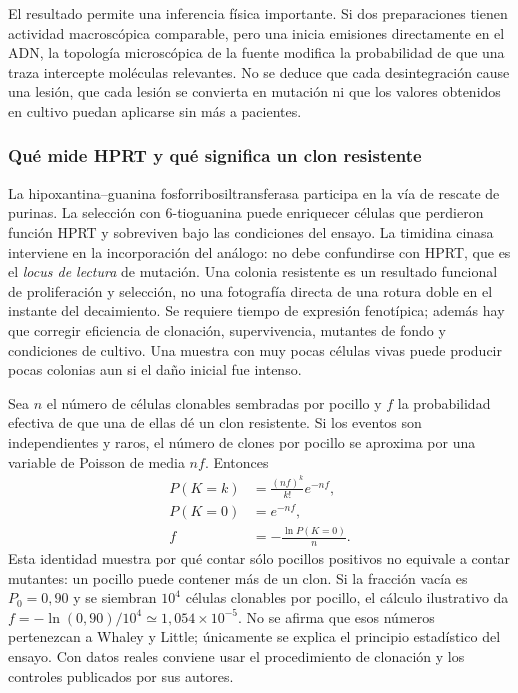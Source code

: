 El resultado permite una inferencia física importante. Si dos preparaciones
tienen actividad macroscópica comparable, pero una inicia emisiones directamente
en el ADN, la topología microscópica de la fuente modifica la probabilidad de
que una traza intercepte moléculas relevantes. No se deduce que cada desintegración
cause una lesión, que cada lesión se convierta en mutación ni que los valores
obtenidos en cultivo puedan aplicarse sin más a pacientes.

\subsubsection{Qué mide HPRT y qué significa un clon resistente}
La hipoxantina--guanina fosforribosiltransferasa participa en la vía de rescate de
purinas. La selección con 6-tioguanina puede enriquecer células que perdieron
función HPRT y sobreviven bajo las condiciones del ensayo. La timidina cinasa
interviene en la incorporación del análogo: no debe confundirse con HPRT,
que es el \emph{locus de lectura} de mutación. Una colonia resistente es un
resultado funcional de proliferación y selección, no una fotografía directa de
una rotura doble en el instante del decaimiento. Se requiere tiempo de expresión
fenotípica; además hay que corregir eficiencia de clonación, supervivencia,
mutantes de fondo y condiciones de cultivo. Una muestra con muy pocas células
vivas puede producir pocas colonias aun si el daño inicial fue intenso.

Sea $n$ el número de células clonables sembradas por pocillo y $f$ la
probabilidad efectiva de que una de ellas dé un clon resistente. Si los
eventos son independientes y raros, el número de clones por pocillo se aproxima
por una variable de Poisson de media $nf$. Entonces
\begin{align}
P(K=k)&=\frac{(nf)^k}{k!}e^{-nf},\\
P(K=0)&=e^{-nf},\\
f&=-\frac{\ln P(K=0)}{n}.
\end{align}
Esta identidad muestra por qué contar sólo pocillos positivos no equivale a
contar mutantes: un pocillo puede contener más de un clon. Si la fracción vacía
es $P_0=0,90$ y se siembran $10^4$ células clonables por pocillo, el cálculo
ilustrativo da $f=-\ln(0,90)/10^4\simeq1,054\times10^{-5}$.
No se afirma que esos números pertenezcan a Whaley y Little; únicamente se
explica el principio estadístico del ensayo. Con datos reales conviene usar
el procedimiento de clonación y los controles publicados por sus autores.

